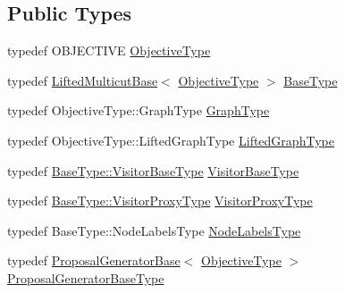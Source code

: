 \subsection*{Public Types}
\begin{DoxyCompactItemize}
\item 
typedef O\+B\+J\+E\+C\+T\+I\+V\+E \hyperlink{classnifty_1_1graph_1_1lifted__multicut_1_1FusionMoveBased_a1522076835fbbde715134a8902dc4dae}{Objective\+Type}
\item 
typedef \hyperlink{classnifty_1_1graph_1_1lifted__multicut_1_1LiftedMulticutBase}{Lifted\+Multicut\+Base}$<$ \hyperlink{classnifty_1_1graph_1_1lifted__multicut_1_1FusionMoveBased_a1522076835fbbde715134a8902dc4dae}{Objective\+Type} $>$ \hyperlink{classnifty_1_1graph_1_1lifted__multicut_1_1FusionMoveBased_ae7800e6d9802f7ce24ac1dd5ddf8e294}{Base\+Type}
\item 
typedef Objective\+Type\+::\+Graph\+Type \hyperlink{classnifty_1_1graph_1_1lifted__multicut_1_1FusionMoveBased_ad9a415cda34d465df54976611bb6f059}{Graph\+Type}
\item 
typedef Objective\+Type\+::\+Lifted\+Graph\+Type \hyperlink{classnifty_1_1graph_1_1lifted__multicut_1_1FusionMoveBased_a7935dfacf7e07d7533c26bf3c0afcb1e}{Lifted\+Graph\+Type}
\item 
typedef \hyperlink{classnifty_1_1graph_1_1optimization_1_1common_1_1SolverBase_a5a14d64c70a9cc0eebc7d71d2b089f9b}{Base\+Type\+::\+Visitor\+Base\+Type} \hyperlink{classnifty_1_1graph_1_1lifted__multicut_1_1FusionMoveBased_a75f55fc3177f6bf8e070df7007bfbb5c}{Visitor\+Base\+Type}
\item 
typedef \hyperlink{classnifty_1_1graph_1_1optimization_1_1common_1_1SolverBase_a58913ea9ab9232ff72608b710c1012d0}{Base\+Type\+::\+Visitor\+Proxy\+Type} \hyperlink{classnifty_1_1graph_1_1lifted__multicut_1_1FusionMoveBased_a2918408ccd082b0d3ce38cfebf8da5ad}{Visitor\+Proxy\+Type}
\item 
typedef Base\+Type\+::\+Node\+Labels\+Type \hyperlink{classnifty_1_1graph_1_1lifted__multicut_1_1FusionMoveBased_a8f102c8a683a95e96d2897a1357dd379}{Node\+Labels\+Type}
\item 
typedef \hyperlink{classnifty_1_1graph_1_1lifted__multicut_1_1ProposalGeneratorBase}{Proposal\+Generator\+Base}$<$ \hyperlink{classnifty_1_1graph_1_1lifted__multicut_1_1FusionMoveBased_a1522076835fbbde715134a8902dc4dae}{Objective\+Type} $>$ \hyperlink{classnifty_1_1graph_1_1lifted__multicut_1_1FusionMoveBased_a71142fa9e518a6f31d384d7edfa3bc13}{Proposal\+Generator\+Base\+Type}
\item 

\end{DoxyCompactItemize}
